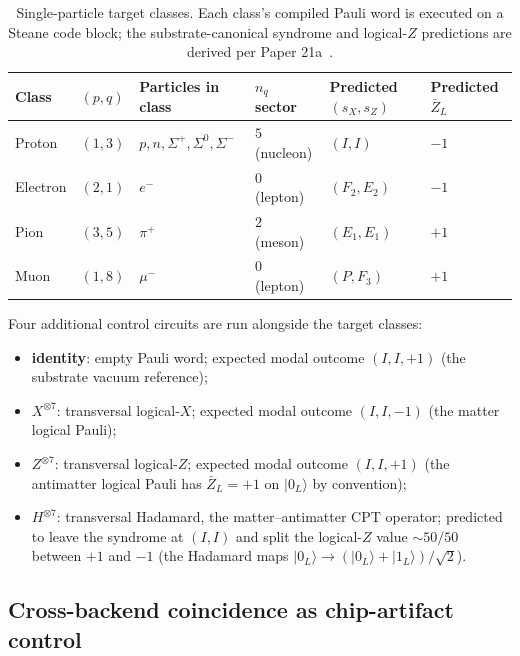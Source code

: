 \documentclass[11pt]{article}
\newcommand{\barZ}{\bar Z_L}
\begin{document}
\begin{table}[h]
\centering
\caption{Single-particle target classes.  Each class's compiled Pauli word is executed on a Steane code block; the substrate-canonical syndrome and logical-$Z$ predictions are derived per Paper 21a~\cite[\S 7]{Paper21a}.}
\label{tab:phase2-targets}
\begin{tabular}{llllll}
\toprule
Class & $(p, q)$ & Particles in class & $n_q$ sector & Predicted $(s_X, s_Z)$ & Predicted $\barZ$ \\
\midrule
Proton    & $(1, 3)$ & $p, n, \Sigma^+, \Sigma^0, \Sigma^-$ & $5$ (nucleon)  & $(I, I)$     & $-1$ \\
Electron  & $(2, 1)$ & $e^-$                                & $0$ (lepton)   & $(F_2, E_2)$ & $-1$ \\
Pion      & $(3, 5)$ & $\pi^+$                              & $2$ (meson)    & $(E_1, E_1)$ & $+1$ \\
Muon      & $(1, 8)$ & $\mu^-$                              & $0$ (lepton)   & $(P, F_3)$   & $+1$ \\
\bottomrule
\end{tabular}
\end{table}

Four additional control circuits are run alongside the target classes:
\begin{itemize}
\item \textbf{identity}: empty Pauli word; expected modal outcome $(I, I, +1)$ (the substrate vacuum reference);
\item \textbf{$X^{\otimes 7}$}: transversal logical-$X$; expected modal outcome $(I, I, -1)$ (the matter logical Pauli);
\item \textbf{$Z^{\otimes 7}$}: transversal logical-$Z$; expected modal outcome $(I, I, +1)$ (the antimatter logical Pauli has $\barZ = +1$ on $|0_L\rangle$ by convention);
\item \textbf{$H^{\otimes 7}$}: transversal Hadamard, the matter--antimatter CPT operator; predicted to leave the syndrome at $(I, I)$ and split the logical-$Z$ value $\sim 50/50$ between $+1$ and $-1$ (the Hadamard maps $|0_L\rangle \to (|0_L\rangle + |1_L\rangle) / \sqrt 2$).
\end{itemize}

\subsection{Cross-backend coincidence as chip-artifact control}
\label{sec:cross-backend}
\end{document}
